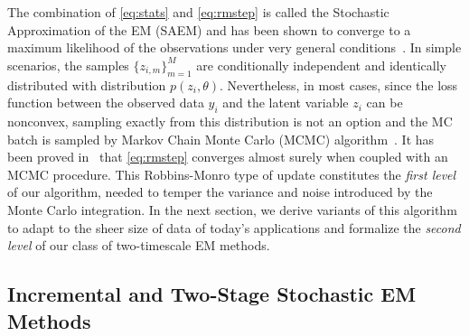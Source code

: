 \documentclass[conference,letterpaper]{IEEEtran}
\begin{document}
The combination of \eqref{eq:stats} and \eqref{eq:rmstep} is called the Stochastic Approximation of the EM (SAEM) and has been shown to converge to a maximum likelihood of the observations under very general conditions~\cite{delyon1999}.
In simple scenarios, the samples $\{z_{i,m}\}_{m=1}^{M}$ are conditionally independent and identically distributed with distribution $p(z_i,\theta)$.
Nevertheless, in most cases, since the loss function between the observed data $y_i$ and the latent variable $z_i$ can be nonconvex, sampling exactly from this distribution is not an option and the MC batch is sampled by Markov Chain Monte Carlo (MCMC) algorithm~\cite{meyn2012markov, brooks2011handbook}.
It has been proved in~\cite{kuhn2004coupling} that \eqref{eq:rmstep} converges almost surely when coupled with an MCMC procedure. 
This Robbins-Monro type of update constitutes the \textit{first level} of our algorithm, needed to temper the variance and noise introduced by the Monte Carlo integration.
In the next section, we derive variants of this algorithm to adapt to the sheer size of data of today's applications and formalize the \textit{second level} of our class of two-timescale EM methods.


\subsection{Incremental and Two-Stage Stochastic EM Methods} \label{sec:sEM}
\end{document}

